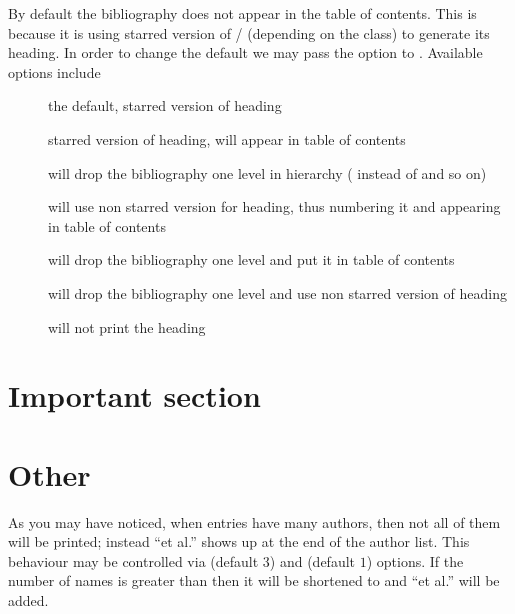 By default the bibliography does not appear in the table of contents. This is
because it is using starred version of \slash{}
(depending on the class) to generate its heading. In order to change the default we
may pass the option  to . Available
options include
\begin{description}
  \item[] the default, starred version of heading
  \item[] starred version of heading, will appear in table of contents
  \item[] will drop the bibliography one level in
    hierarchy ( instead of  and so on)
  \item[] will use non starred version for heading, thus
    numbering it and appearing in table of contents
  \item[] will drop the bibliography one level and put it in
    table of contents
  \item[] will drop the bibliography one level and use
    non starred version of heading
  \item[] will not print the heading
\end{description}

\begin{example}[
  standalone,
  biber,
  paperwidth=7cm,
  paperheight=7.5cm,
]
\usepackage{biblatex}


\setlength{\parindent}{0pt}
\nocite{curie}
\tableofcontents
\section{Important section}


\section{Other}

\printbibliography[
  heading=subbibnumbered,
  title=Bibliography,
]



\end{example}

As you may have noticed, when entries have many authors, then not all of
them will be printed; instead ``et al.'' shows up at the end of the author list. This behaviour
may be controlled via  (default $3$) and 
(default $1$) options. If the number of names is greater than 
then it will be shortened to  and ``et al.'' will be added.

